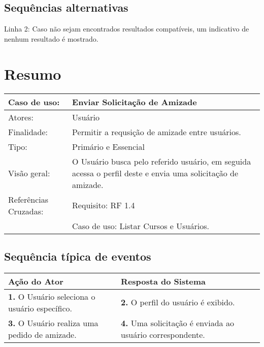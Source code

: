 \documentclass[12pt,a4paper,onecolumn,titlepage]{article}
\begin{document}
\subsection{Sequências alternativas}
Linha 2: Caso não sejam encontrados resultados compatíveis, um indicativo de nenhum resultado é mostrado.
\newpage

\section{Resumo}
\begin{table}[h!]
\begin{center}
\begin{tabular}{p{2.5cm} p{9.5cm}}
Caso de uso: & \textbf{Enviar Solicitação de Amizade} \\ \hline
Atores: & Usuário \\ \hline
Finalidade: & Permitir a requsição de amizade entre usuários. \\ \hline
Tipo: & Primário e Essencial \\ \hline
Visão geral: & O Usuário busca pelo referido usuário, em seguida acessa o perfil deste e envia uma solicitação de amizade. \\ \hline
Referências Cruzadas: & Requisito: RF 1.4 \\ & Caso de uso: Listar Cursos e Usuários.
\end{tabular}
\end{center}
\end{table}

\subsection{Sequência típica de eventos}
\begin{center}
\def\arraystretch{1.1}
\begin{tabular}{|p{6cm}|p{6cm}|}

\hline
\textbf{Ação do Ator} & \textbf{Resposta do Sistema} \\ \hline
\textbf{1.} O Usuário seleciona o usuário específico. & \textbf{2.} O perfil do usuário é exibido. \\ \hline
\textbf{3.} O Usuário realiza uma pedido de amizade. & \textbf{4.} Uma solicitação é enviada ao usuário correspondente. \\ \hline
\end{tabular}
\end{center}

\newpage
\end{document}
